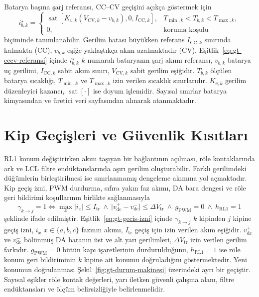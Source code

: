Batarya başına şarj referansı, CC--CV geçişini açıkça göstermek için
\begin{equation}
  i_{b,k}^{\star}=
  \begin{cases}
    \operatorname{sat}\!\left[K_{v,k}\left(V_{\mathrm{CV},k}-v_{b,k}\right),0,I_{\mathrm{CC},k}\right],
      & T_{\min,k}<T_{b,k}<T_{\max,k},\\
    0, & \text{koruma koşulu}
  \end{cases}
  \label{eq:gt-cccv-referansi}
\end{equation}
biçiminde tanımlanabilir. Gerilim hatası büyükken referans $I_{\mathrm{CC},k}$ sınırında kalmakta (CC), $v_{b,k}$ eşiğe yaklaştıkça akım azalmaktadır (CV). Eşitlik~\eqref{eq:gt-cccv-referansi} içinde $i_{b,k}^{\star}$ $k$ numaralı bataryanın şarj akımı referansı, $v_{b,k}$ batarya uç gerilimi, $I_{\mathrm{CC},k}$ sabit akım sınırı, $V_{\mathrm{CV},k}$ sabit gerilim eşiğidir. $T_{b,k}$ ölçülen batarya sıcaklığı, $T_{\min,k}$ ve $T_{\max,k}$ izin verilen sıcaklık sınırlarıdır. $K_{v,k}$ gerilim düzenleyici kazancı, $\operatorname{sat}[\cdot]$ ise doyum işlemidir. Sayısal sınırlar batarya kimyasından ve üretici veri sayfasından alınarak atanmaktadır.

\section{Kip Geçişleri ve Güvenlik Kısıtları}
\label{sec:gt-gecis-guvenlik}

RL1 konum değiştirirken akım taşıyan bir bağlantının açılması, röle kontaklarında ark ve LCL filtre endüktanslarında aşırı gerilim oluşturabilir. Farklı gerilimdeki düğümlerin birleştirilmesi ise sınırlanmamış dengeleme akımına yol açmaktadır. Kip geçiş izni, PWM durdurma, sıfıra yakın faz akımı, DA bara dengesi ve röle geri bildirimi koşullarının birlikte sağlanmasıyla
\begin{equation}
  \gamma_{k\rightarrow j}=1
  \iff
  \max_{x}|i_{x}|\leq I_{\mathrm{tr}}
  \ \land\
  \bigl|v_{\mathrm{dc}}^{+}-v_{\mathrm{dc}}^{-}\bigr|\leq \Delta V_{\mathrm{tr}}
  \ \land\
  g_{\mathrm{PWM}}=0
  \ \land\
  h_{\mathrm{RL1}}=1
  \label{eq:gt-gecis-izni}
\end{equation}
şeklinde ifade edilmiştir. Eşitlik~\eqref{eq:gt-gecis-izni} içinde $\gamma_{k\rightarrow j}$ $k$ kipinden $j$ kipine geçiş izni, $i_{x}$ $x\in\{a,b,c\}$ fazının akımı, $I_{\mathrm{tr}}$ geçiş için izin verilen akım eşiğidir. $v_{\mathrm{dc}}^{+}$ ve $v_{\mathrm{dc}}^{-}$ bölünmüş DA baranın üst ve alt yarı gerilimleri, $\Delta V_{\mathrm{tr}}$ izin verilen gerilim farkıdır. $g_{\mathrm{PWM}}=0$ bütün kapı işaretlerinin durdurulduğunu, $h_{\mathrm{RL1}}=1$ ise röle konum geri bildiriminin $k$ kipine ait konumu doğruladığını göstermektedir. Yeni konumun doğrulanması Şekil~\ref{fig:gt-durum-makinesi} üzerindeki ayrı bir geçiştir. Sayısal eşikler röle kontak değerleri, yarı iletken güvenli çalışma alanı, filtre endüktansları ve ölçüm belirsizliğiyle belirlenmelidir.

